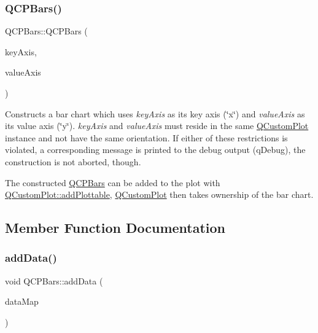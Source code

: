 \subsubsection{\texorpdfstring{Q\+C\+P\+Bars()}{QCPBars()}}
{\footnotesize\ttfamily Q\+C\+P\+Bars\+::\+Q\+C\+P\+Bars (\begin{DoxyParamCaption}\item[{\hyperlink{class_q_c_p_axis}{Q\+C\+P\+Axis} $\ast$}]{key\+Axis,  }\item[{\hyperlink{class_q_c_p_axis}{Q\+C\+P\+Axis} $\ast$}]{value\+Axis }\end{DoxyParamCaption})\hspace{0.3cm}{\ttfamily [explicit]}}

Constructs a bar chart which uses {\itshape key\+Axis} as its key axis (\char`\"{}x\char`\"{}) and {\itshape value\+Axis} as its value axis (\char`\"{}y\char`\"{}). {\itshape key\+Axis} and {\itshape value\+Axis} must reside in the same \hyperlink{class_q_custom_plot}{Q\+Custom\+Plot} instance and not have the same orientation. If either of these restrictions is violated, a corresponding message is printed to the debug output (q\+Debug), the construction is not aborted, though.

The constructed \hyperlink{class_q_c_p_bars}{Q\+C\+P\+Bars} can be added to the plot with \hyperlink{class_q_custom_plot_ab7ad9174f701f9c6f64e378df77927a6}{Q\+Custom\+Plot\+::add\+Plottable}, \hyperlink{class_q_custom_plot}{Q\+Custom\+Plot} then takes ownership of the bar chart. 

\subsection{Member Function Documentation}
\hypertarget{class_q_c_p_bars_a1f29cf08615040993209147fa68de3f2}{}\label{class_q_c_p_bars_a1f29cf08615040993209147fa68de3f2} 
\subsubsection{\texorpdfstring{add\+Data()}{addData()}\hspace{0.1cm}{\footnotesize\ttfamily [1/4]}}
{\footnotesize\ttfamily void Q\+C\+P\+Bars\+::add\+Data (\begin{DoxyParamCaption}\item[{const \hyperlink{qcustomplot_8h_aa846c77472cae93def9f1609d0c57191}{Q\+C\+P\+Bar\+Data\+Map} \&}]{data\+Map }\end{DoxyParamCaption})}

